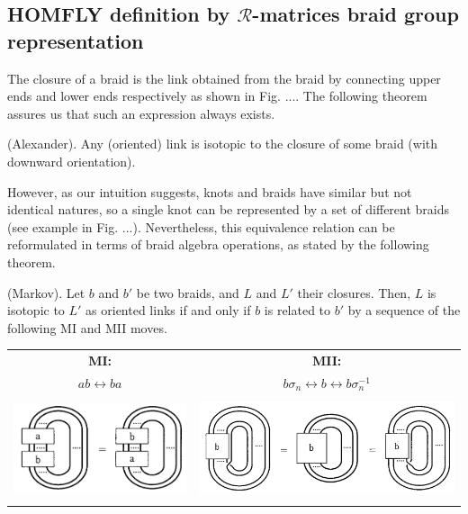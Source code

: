 \documentclass[12pt,a4paper]{article}
\begin{document}
\subsection{HOMFLY definition by $\mathcal{R}$-matrices braid group representation}

The closure of a braid is the link obtained from the braid by connecting upper
ends and lower ends respectively as shown in Fig. .... The following theorem
assures us that such an expression always exists.
\begin{tcolorbox}
\begin{theorem}\label{thm:Alexander}
   (Alexander). Any (oriented) link is isotopic to the closure of some
braid (with downward orientation).  
\end{theorem}
\end{tcolorbox} 

However, as our intuition suggests, knots and braids have similar but not identical natures, so a single knot can be represented by a set of different braids (see example in Fig. ...). Nevertheless, this equivalence relation can be reformulated in terms of braid algebra operations, as stated by the following theorem.
\begin{tcolorbox}
\begin{theorem}\label{thm:Alexander}
   (Markov).  Let $b$ and $b'$ be two braids, and $L$ and $L'$ their closures.
Then, $L$ is isotopic to $L'$ as oriented links if and only if $b$ is related to $b'$ by a
sequence of the following MI and MII moves.

\begin{center}
\begin{tabular}{c c}
\textbf{MI:} & \textbf{MII:} \\
$ab \longleftrightarrow ba$ & $b \sigma_n \longleftrightarrow b \longleftrightarrow b \sigma_n^{-1}$ \\[2mm]  
\includegraphics[height=3cm]{../img/MI.png} &
\includegraphics[height=3cm]{../img/MII.png}
\end{tabular}
\end{center}

\end{theorem}
\end{tcolorbox} 
\end{document}
